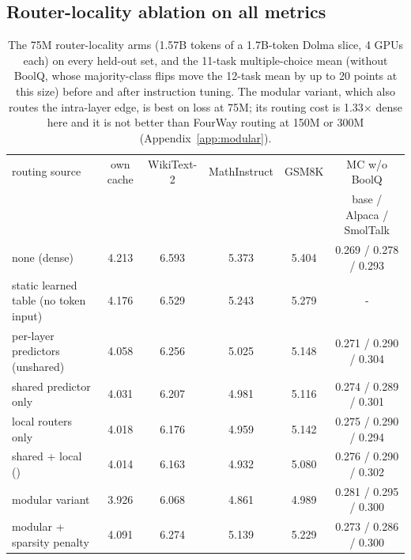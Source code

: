 \subsection{Router-locality ablation on all metrics}
\label{app:locality}
\begin{table}[h]\centering\footnotesize\setlength{\tabcolsep}{2.5pt}
\begin{tabular}{lccccc}\toprule
routing source & own cache & WikiText-2 & MathInstruct & GSM8K & MC w/o BoolQ \\
 & & & & & base / Alpaca / SmolTalk \\\midrule
none (dense) & 4.213 & 6.593 & 5.373 & 5.404 & 0.269 / 0.278 / 0.293 \\
static learned table (no token input) & 4.176 & 6.529 & 5.243 & 5.279 & - \\
per-layer predictors (unshared) & 4.058 & 6.256 & 5.025 & 5.148 & 0.271 / 0.290 / 0.304 \\
shared predictor only & 4.031 & 6.207 & 4.981 & 5.116 & 0.274 / 0.289 / 0.301 \\
local routers only & 4.018 & 6.176 & 4.959 & 5.142 & 0.275 / 0.290 / 0.294 \\
shared + local (\dagf{}) & 4.014 & 6.163 & 4.932 & 5.080 & 0.276 / 0.290 / 0.302 \\
modular variant & 3.926 & 6.068 & 4.861 & 4.989 & 0.281 / 0.295 / 0.300 \\
modular + sparsity penalty & 4.091 & 6.274 & 5.139 & 5.229 & 0.273 / 0.286 / 0.300 \\
\bottomrule\end{tabular}
\caption{The 75M router-locality arms (1.57B tokens of a 1.7B-token Dolma slice, 4 GPUs each) on every held-out set, and the 11-task multiple-choice mean (without BoolQ, whose majority-class flips move the 12-task mean by up to 20 points at this size) before and after instruction tuning. The modular variant, which also routes the intra-layer edge, is best on loss at 75M; its routing cost is 1.33$\times$ dense here and it is not better than FourWay routing at 150M or 300M (Appendix~\ref{app:modular}).}
\label{tab:locality_all}\end{table}

